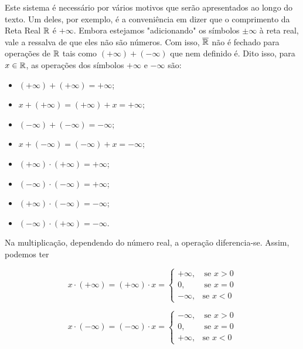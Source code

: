     Este sistema é necessário por vários motivos que serão apresentados ao longo do texto. 
    Um deles, por exemplo, é a conveniência em dizer que o comprimento da Reta Real $\mathbb{R}$ é $+\infty$.
    Embora estejamos "adicionando" os símbolos $\pm \infty$ à reta real, vale a ressalva de que eles não são números.
    Com isso, $\operatorname{\overline{\mathbb{R}}}$ não é fechado para operações de $\mathbb{R}$ tais como $(+\infty) + (-\infty)$ que nem definido é.
    Dito isso, para $x \in \mathbb{R}$, as operações dos símbolos $+\infty$ e $-\infty$ são:
    \begin{multicols}{2}
        \begin{itemize}
            \item $(+ \infty) + (+ \infty)  = + \infty$;
            \item $x + (+ \infty) = (+ \infty) + x = + \infty$;
            \item $(- \infty) + (- \infty)  = - \infty$;
            \item $x + (- \infty) = (- \infty) + x = - \infty$;
            \item $(+ \infty)\cdot (+ \infty) =  +\infty $;
            \item $(- \infty)\cdot (- \infty) =  +\infty $;
            \item $(+ \infty)\cdot (- \infty) =  -\infty $;
            \item $(- \infty)\cdot (+ \infty) =  -\infty $.
        \end{itemize}
    \end{multicols}
    Na multiplicação, dependendo do número real, a operação diferencia-se.
    Assim, podemos ter
    \begin{multicols}{2}
    $$
    x \cdot (+\infty) = (+\infty) \cdot x =
    \left\{\begin{array}{cc}
          +\infty, & \ \textrm{se } x > 0\\
          0, & \ \textrm{se } x = 0\\
          - \infty, & \textrm{se } x < 0
    \end{array}\right.
    $$
    
    $$
    x \cdot (-\infty) = (-\infty) \cdot x =
    \left\{\begin{array}{cc}
          -\infty, & \ \textrm{se } x > 0\\
          0, & \ \textrm{se } x = 0\\
          + \infty, & \textrm{se } x < 0
    \end{array}\right.
    $$  
    \end{multicols}

